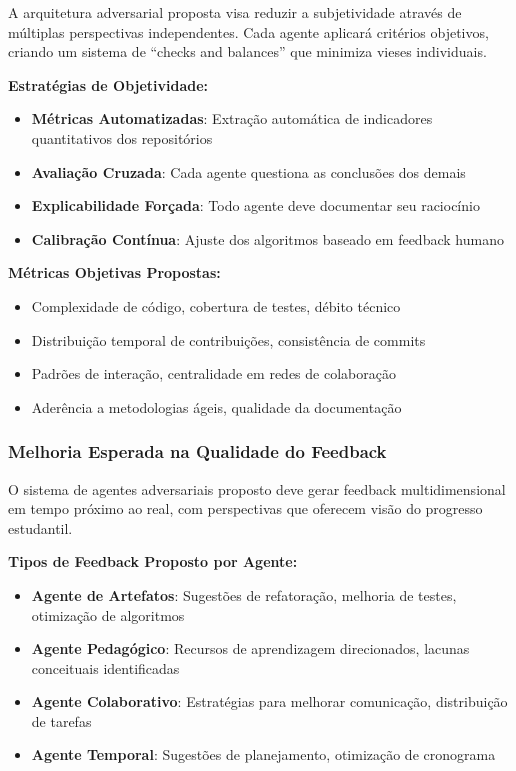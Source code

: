 \documentclass[english, spanish, brazilian]{modelo_dt}
\begin{document}
A arquitetura adversarial proposta visa reduzir a subjetividade através de múltiplas perspectivas independentes\@. Cada agente aplicará critérios objetivos, criando um sistema de ``checks and balances'' que minimiza vieses individuais\@.

\textbf{Estratégias de Objetividade:}
\begin{itemize}
\item \textbf{Métricas Automatizadas}: Extração automática de indicadores quantitativos dos repositórios
\item \textbf{Avaliação Cruzada}: Cada agente questiona as conclusões dos demais
\item \textbf{Explicabilidade Forçada}: Todo agente deve documentar seu raciocínio
\item \textbf{Calibração Contínua}: Ajuste dos algoritmos baseado em feedback humano
\end{itemize}

\textbf{Métricas Objetivas Propostas:}
\begin{itemize}
\item Complexidade de código, cobertura de testes, débito técnico
\item Distribuição temporal de contribuições, consistência de commits
\item Padrões de interação, centralidade em redes de colaboração
\item Aderência a metodologias ágeis, qualidade da documentação
\end{itemize}

\subsubsection{Melhoria Esperada na Qualidade do Feedback}

O sistema de agentes adversariais proposto deve gerar feedback multidimensional em tempo próximo ao real, com perspectivas que oferecem visão do progresso estudantil.

\textbf{Tipos de Feedback Proposto por Agente:}
\begin{itemize}
\item \textbf{Agente de Artefatos}: Sugestões de refatoração, melhoria de testes, otimização de algoritmos
\item \textbf{Agente Pedagógico}: Recursos de aprendizagem direcionados, lacunas conceituais identificadas
\item \textbf{Agente Colaborativo}: Estratégias para melhorar comunicação, distribuição de tarefas
\item \textbf{Agente Temporal}: Sugestões de planejamento, otimização de cronograma
\end{itemize}
\end{document}
